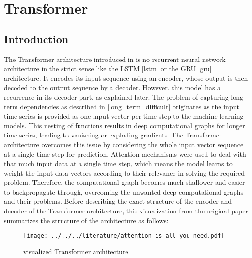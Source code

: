 \documentclass[draft,final]{vutinfth} %
\begin{document}
    \section{Transformer} \label{transformer}

    \subsection{Introduction}
    The Transformer architecture introduced in \cite{Transformer} is no recurrent neural network architecture in the strict sense like the LSTM \ref{lstm} or the GRU \ref{gru} architecture.
    It encodes its input sequence using an encoder, whose output is then decoded to the output sequence by a decoder.
    However, this model has a recurrence in its decoder part, as explained later.
    The problem of capturing long-term dependencies as described in \ref{long_term_difficult} originates as the input time-series is provided as one input vector per time step to the machine learning models.
    This nesting of functions results in deep computational graphs for longer time-series, leading to vanishing or exploding gradients.
    The Transformer architecture overcomes this issue by considering the whole input vector sequence at a single time step for prediction.
    Attention mechanisms were used to deal with that much input data at a single time step, which means the model learns to weight the input data vectors according to their relevance in solving the required problem.
    Therefore, the computational graph becomes much shallower and easier to backpropagate through, overcoming the unwanted deep computational graphs and their problems.
    Before describing the exact structure of the encoder and decoder of the Transformer architecture, this visualization from the original paper summarizes the structure of the architecture as follows:
    \begin{figure}[H]
        \centering{}
        \texttt{[image: ../../../literature/attention\_is\_all\_you\_need.pdf]}
        \caption{visualized Transformer architecture \cite[p. 3]{Transformer}}
        \label{fig:transformer_vis}
    \end{figure}
\end{document}
